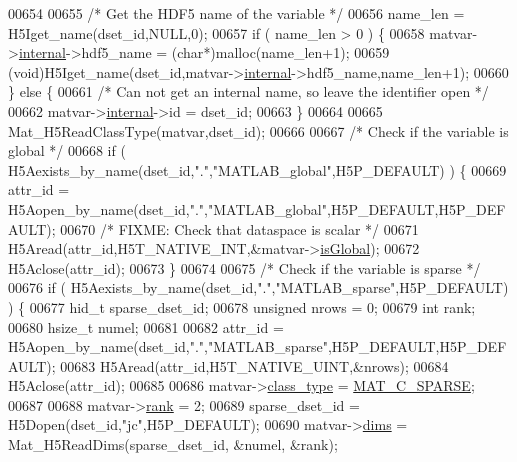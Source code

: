 \begin{DoxyCode}
00654 
00655     \textcolor{comment}{/* Get the HDF5 name of the variable */}
00656     name\_len = H5Iget\_name(dset\_id,NULL,0);
00657     \textcolor{keywordflow}{if} ( name\_len > 0 ) \{
00658         matvar->\hyperlink{group___m_a_t_a6e97e3ed9f40c49322c18561c2a94e92}{internal}->hdf5\_name = (\textcolor{keywordtype}{char}*)malloc(name\_len+1);
00659         (void)H5Iget\_name(dset\_id,matvar->\hyperlink{group___m_a_t_a6e97e3ed9f40c49322c18561c2a94e92}{internal}->hdf5\_name,name\_len+1);
00660     \} \textcolor{keywordflow}{else} \{
00661         \textcolor{comment}{/* Can not get an internal name, so leave the identifier open */}
00662         matvar->\hyperlink{group___m_a_t_a6e97e3ed9f40c49322c18561c2a94e92}{internal}->id = dset\_id;
00663     \}
00664 
00665     Mat\_H5ReadClassType(matvar,dset\_id);
00666 
00667     \textcolor{comment}{/* Check if the variable is global */}
00668     \textcolor{keywordflow}{if} ( H5Aexists\_by\_name(dset\_id,\textcolor{stringliteral}{"."},\textcolor{stringliteral}{"MATLAB\_global"},H5P\_DEFAULT) ) \{
00669         attr\_id = H5Aopen\_by\_name(dset\_id,\textcolor{stringliteral}{"."},\textcolor{stringliteral}{"MATLAB\_global"},H5P\_DEFAULT,H5P\_DEFAULT);
00670         \textcolor{comment}{/* FIXME: Check that dataspace is scalar */}
00671         H5Aread(attr\_id,H5T\_NATIVE\_INT,&matvar->\hyperlink{group___m_a_t_af26c71c4c0ddb14931d15910dddac1bc}{isGlobal});
00672         H5Aclose(attr\_id);
00673     \}
00674 
00675     \textcolor{comment}{/* Check if the variable is sparse */}
00676     \textcolor{keywordflow}{if} ( H5Aexists\_by\_name(dset\_id,\textcolor{stringliteral}{"."},\textcolor{stringliteral}{"MATLAB\_sparse"},H5P\_DEFAULT) ) \{
00677         hid\_t sparse\_dset\_id;
00678         \textcolor{keywordtype}{unsigned} nrows = 0;
00679         \textcolor{keywordtype}{int} rank;
00680         hsize\_t numel;
00681 
00682         attr\_id = H5Aopen\_by\_name(dset\_id,\textcolor{stringliteral}{"."},\textcolor{stringliteral}{"MATLAB\_sparse"},H5P\_DEFAULT,H5P\_DEFAULT);
00683         H5Aread(attr\_id,H5T\_NATIVE\_UINT,&nrows);
00684         H5Aclose(attr\_id);
00685 
00686         matvar->\hyperlink{group___m_a_t_aff13035bf3265dd7d9425e5d40c839d4}{class\_type} = \hyperlink{group___m_a_t_ggad4d60ae7b709fc81bfd744fb4c857c40a0d5655b7e6178a2242cb3bb56ff4c8d2}{MAT\_C\_SPARSE};
00687 
00688         matvar->\hyperlink{group___m_a_t_a84ba70c96ded13cc555fa75b768d9921}{rank} = 2;
00689         sparse\_dset\_id = H5Dopen(dset\_id,\textcolor{stringliteral}{"jc"},H5P\_DEFAULT);
00690         matvar->\hyperlink{group___m_a_t_a8e01234e1c862ce3472bb37f5a09b92c}{dims} = Mat\_H5ReadDims(sparse\_dset\_id, &numel, &rank);

\end{DoxyCode}

